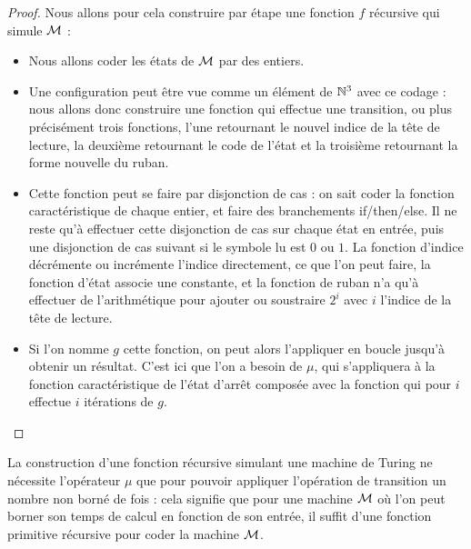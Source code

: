 \begin{proof}
    Nous allons pour cela construire par étape une fonction $f$ récursive qui simule $\mathcal M$ :
    \begin{itemize}[label=$\bullet$]
        \item Nous allons coder les états de $\mathcal M$ par des entiers.
        \item Une configuration peut être vue comme un élément de $\mathbb{N}^3$ avec ce codage : nous allons donc construire une fonction qui effectue une transition, ou plus précisément trois fonctions, l'une retournant le nouvel indice de la tête de lecture, la deuxième retournant le code de l'état et la troisième retournant la forme nouvelle du ruban.
        \item Cette fonction peut se faire par disjonction de cas : on sait coder la fonction caractéristique de chaque entier, et faire des branchements if/then/else. Il ne reste qu'à effectuer cette disjonction de cas sur chaque état en entrée, puis une disjonction de cas suivant si le symbole lu est $0$ ou $1$. La fonction d'indice décrémente ou incrémente l'indice directement, ce que l'on peut faire, la fonction d'état associe une constante, et la fonction de ruban n'a qu'à effectuer de l'arithmétique pour ajouter ou soustraire $2^i$ avec $i$ l'indice de la tête de lecture.
        \item Si l'on nomme $g$ cette fonction, on peut alors l'appliquer en boucle jusqu'à obtenir un résultat. C'est ici que l'on a besoin de $\mu$, qui s'appliquera à la fonction caractéristique de l'état d'arrêt composée avec la fonction qui pour $i$ effectue $i$ itérations de $g$.
    \end{itemize}
\end{proof}

\begin{rmk}
    La construction d'une fonction récursive simulant une machine de Turing ne nécessite l'opérateur $\mu$ que pour pouvoir appliquer l'opération de transition un nombre non borné de fois : cela signifie que pour une machine $\mathcal M$ où l'on peut borner son temps de calcul en fonction de son entrée, il suffit d'une fonction primitive récursive pour coder la machine $\mathcal M$.
\end{rmk}

